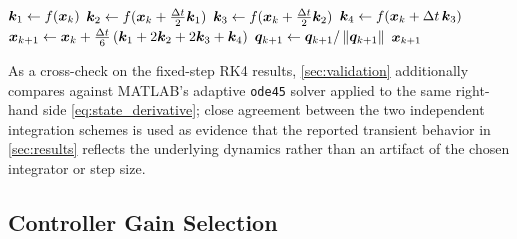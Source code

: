 \begin{algorithm}[htbp]
\caption{Closed-loop RK4 integration step}
\label{alg:rk4}
\begin{algorithmic}[1]
    \State $\bm{k}_1 \gets f(\bm{x}_k)$ 
    \State $\bm{k}_2 \gets f(\bm{x}_k + \tfrac{\Delta t}{2}\bm{k}_1)$
    \State $\bm{k}_3 \gets f(\bm{x}_k + \tfrac{\Delta t}{2}\bm{k}_2)$
    \State $\bm{k}_4 \gets f(\bm{x}_k + \Delta t\,\bm{k}_3)$
    \State $\bm{x}_{k+1} \gets \bm{x}_k + \tfrac{\Delta t}{6}\left(\bm{k}_1 + 2\bm{k}_2 + 2\bm{k}_3 + \bm{k}_4\right)$
    \State $\bm{q}_{k+1} \gets \bm{q}_{k+1} / \left\lVert \bm{q}_{k+1} \right\rVert$ 
    \State \Return $\bm{x}_{k+1}$
\EndFunction
\end{algorithmic}
\end{algorithm}

As a cross-check on the fixed-step RK4 results, \cref{sec:validation} additionally compares against MATLAB's adaptive \texttt{ode45} solver applied to the same right-hand side \cref{eq:state_derivative}; close agreement between the two independent integration schemes is used as evidence that the reported transient behavior in \cref{sec:results} reflects the underlying dynamics rather than an artifact of the chosen integrator or step size.

\subsection{Controller Gain Selection}
\label{sec:gain_selection}

